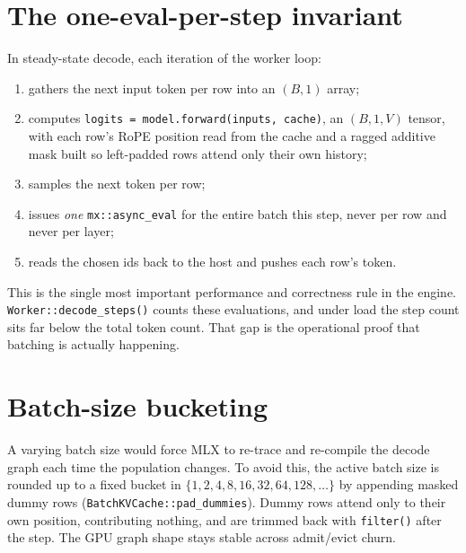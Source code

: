 \documentclass[11pt,a4paper]{report}
\newcommand{\code}[1]{\texttt{#1}}
\begin{document}
\section{The one-eval-per-step invariant}
In steady-state decode, each iteration of the worker loop:
\begin{enumerate}[nosep]
  \item gathers the next input token per row into an $(B,1)$ array;
  \item computes \code{logits = model.forward(inputs, cache)}, an $(B,1,V)$ tensor,
        with each row's RoPE position read from the cache and a ragged additive
        mask built so left-padded rows attend only their own history;
  \item samples the next token per row;
  \item issues \emph{one} \code{mx::async\_eval} for the entire batch this step,
        never per row and never per layer;
  \item reads the chosen ids back to the host and pushes each row's token.
\end{enumerate}
This is the single most important performance and correctness rule in the engine.
\code{Worker::decode\_steps()} counts these evaluations, and under load the step
count sits far below the total token count. That gap is the operational proof that
batching is actually happening.

\section{Batch-size bucketing}
A varying batch size would force MLX to re-trace and re-compile the decode graph
each time the population changes. To avoid this, the active batch size is rounded up
to a fixed bucket in $\{1,2,4,8,16,32,64,128,\dots\}$ by appending masked dummy
rows (\code{BatchKVCache::pad\_dummies}). Dummy rows attend only to their own
position, contributing nothing, and are trimmed back with \code{filter()} after the
step. The GPU graph shape stays stable across admit/evict churn.
\end{document}
